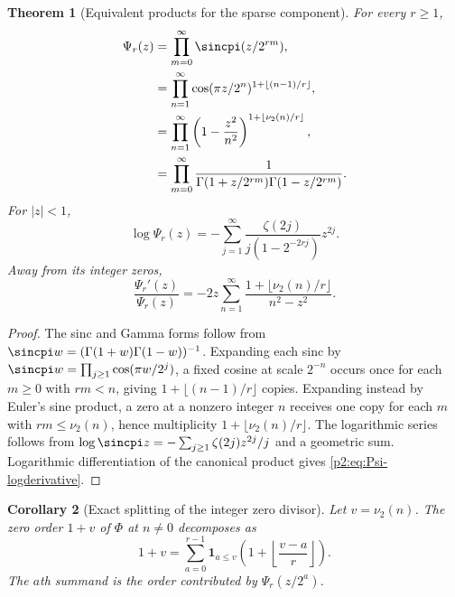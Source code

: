 \documentclass[11pt,oneside]{article}
\newtheorem{theorem}{Theorem}[section]
\newtheorem{corollary}[theorem]{Corollary}
\theoremstyle{definition}
\newcommand{\vtwo}{\nu_2}
\begin{document}
\begin{theorem}[Equivalent products for the sparse component]
\label{p2:thm:Psi-products}
For every $r\ge1$,
\begin{align}
 \Psi_r(z)
 &=\prod_{m=0}^{\infty}\sincpi(z/2^{rm}),                  \label{p2:eq:Psi-sinc}\\
 &=\prod_{n=1}^{\infty}
   \cos(\pi z/2^n)^{1+\lfloor(n-1)/r\rfloor},              \label{p2:eq:Psi-cos}\\
 &=\prod_{n=1}^{\infty}
   \left(1-\frac{z^2}{n^2}\right)^{1+\lfloor\vtwo(n)/r\rfloor}, \label{p2:eq:Psi-canonical}\\
 &=\prod_{m=0}^{\infty}
   \frac1{\Gamma(1+z/2^{rm})\Gamma(1-z/2^{rm})}.           \label{p2:eq:Psi-gamma}
\end{align}
For $|z|<1$,
\begin{equation}
 \log\Psi_r(z)
 =-\sum_{j=1}^{\infty}
   \frac{\zeta(2j)}{j(1-2^{-2rj})}z^{2j}.                 \label{p2:eq:Psi-log-zeta}
\end{equation}
Away from its integer zeros,
\begin{equation}
 \frac{\Psi_r'(z)}{\Psi_r(z)}
 =-2z\sum_{n=1}^{\infty}
   \frac{1+\lfloor\vtwo(n)/r\rfloor}{n^2-z^2}.            \label{p2:eq:Psi-logderivative}
\end{equation}
\end{theorem}

\begin{proof}
The sinc and Gamma forms follow from
$\sincpi w=(\Gamma(1+w)\Gamma(1-w))^{-1}$.  Expanding each sinc by
$\sincpi w=\prod_{j\ge1}\cos(\pi w/2^j)$, a fixed cosine at scale $2^{-n}$
occurs once for each $m\ge0$ with $rm<n$, giving
$1+\lfloor(n-1)/r\rfloor$ copies.  Expanding instead by Euler's sine product,
a zero at a nonzero integer $n$ receives one copy for each $m$ with
$rm\le\vtwo(n)$, hence multiplicity $1+\lfloor\vtwo(n)/r\rfloor$.
The logarithmic series follows from
\(
 \log\sincpi z=-\sum_{j\ge1}\zeta(2j)z^{2j}/j
\)
and a geometric sum.  Logarithmic differentiation of the canonical product
gives \eqref{p2:eq:Psi-logderivative}.
\end{proof}

\begin{corollary}[Exact splitting of the integer zero divisor]
\label{p2:cor:zero-divisor-split}
Let $v=\vtwo(n)$.  The zero order $1+v$ of $\Phi$ at $n\ne0$ decomposes as
\begin{equation}
 1+v=\sum_{a=0}^{r-1}
 \mathbf1_{a\le v}\left(1+\left\lfloor\frac{v-a}{r}\right\rfloor\right). \label{p2:eq:valuation-split}
\end{equation}
The $a$th summand is the order contributed by $\Psi_r(z/2^a)$.
\end{corollary}
\end{document}
